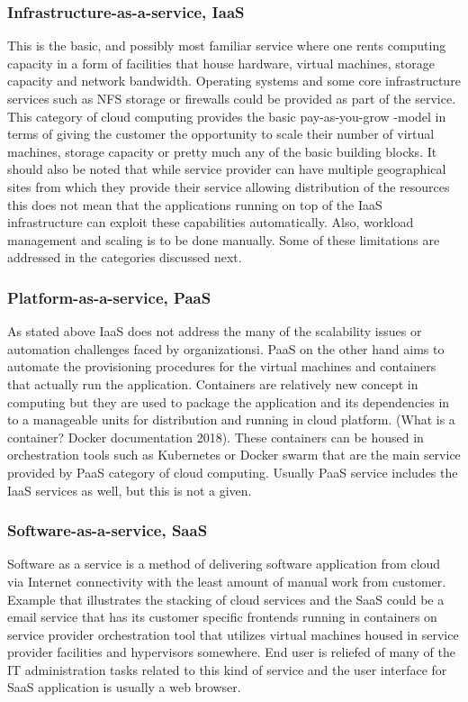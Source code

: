 \documentclass{article}
\begin{document}
\subsubsection{Infrastructure-as-a-service, IaaS}
This is the basic, and possibly most familiar service where one rents computing capacity in a form of facilities that house hardware, virtual machines, storage capacity and network bandwidth.
Operating systems and some core infrastructure services such as NFS storage or firewalls could be provided as part of the service. This category of cloud computing provides the basic pay-as-you-grow -model in terms of giving the customer the opportunity to scale their number of virtual machines, storage capacity or pretty much any of the basic building blocks.
It should also be noted that while service provider can have multiple geographical sites from which they provide their service allowing distribution of the resources this does not mean that the applications running on top of the IaaS infrastructure can exploit these capabilities automatically.
Also, workload management and scaling is to be done manually. Some of these limitations are addressed in the categories discussed next.
\subsubsection{Platform-as-a-service, PaaS}
As stated above IaaS does not address the many of the scalability issues or automation challenges faced by organizationsi.
PaaS on the other hand aims to automate the provisioning procedures for the virtual machines and containers that actually run the application.
Containers are relatively new concept in computing but they are used to package the application and its dependencies in to a manageable units for distribution and running in cloud platform. (What is a container? Docker documentation 2018).
These containers can be housed in orchestration tools such as Kubernetes or Docker swarm that are the main service provided by PaaS category of cloud computing. 
Usually PaaS service includes the IaaS services as well, but this is not a given.
\subsubsection{Software-as-a-service, SaaS}
Software as a service is a method of delivering software application from cloud via Internet connectivity with the least amount of manual work from customer.
Example that illustrates the stacking of cloud services and the SaaS could be a email service that has its customer specific frontends running in containers on service provider orchestration tool that utilizes virtual machines housed in service provider facilities  and hypervisors somewhere.
End user is reliefed of many of the IT administration tasks related to this kind of service and the user interface for SaaS application is usually a web browser.
\end{document}
